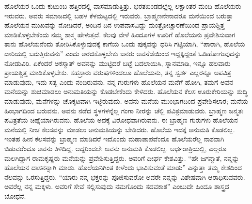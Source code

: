 ಹೊಲೆಯರ ಒಂದು ಕುಟುಂಬ ಹತ್ತಿರದಲ್ಲಿ ವಾಸಮಾಡುತ್ತಿತ್ತು. ಭರತಖಂಡದಲ್ಲೆಲ್ಲ ಲಕ್ಷಾಂತರ ಮಂದಿ ಹೊಲೆಯರು ಇರುವರು. ಅವರು ಸಮಾಜದಲ್ಲಿ ಬಹಳ ಕೆಳಮಟ್ಟದಲ್ಲಿ ಇರುವರು. ಬ್ರಾಹ್ಮಣನೇನಾದರೂ ಮನೆಯಿಂದ ಬರುತ್ತಾ ಹೊಲೆಯನ ಮುಖವನ್ನು ನೋಡಿದರೆ, ಅಂದಿನ ದಿನ ಉಪವಾಸವಿದ್ದು ಮಂತ್ರೋಚ್ಚಾರಣೆಯಿಂದ ಪ್ರಾಯಶ್ಚಿತ್ತ ಮಾಡಿಕೊಳ್ಳಬೇಕೆಂದು ನಮ್ಮ ಶಾಸ್ತ್ರ ಹೇಳುತ್ತದೆ. ಕೆಲವು ವೇಳೆ ಹಿಂದೂಗಳ ಊರಿಗೆ ಹೊಲೆಯನು ಪ್ರವೇಶಿಸುವಾಗ ತಾನು ಹೊಲೆಯನೆಂದು ತೋರಿಸಿಕೊಳ್ಳುವುದಕ್ಕೆ ಕಾಗೆಯ ಒಂದು ಪುಕ್ಕವನ್ನು ಧರಿಸಿ ಗಟ್ಟಿಯಾಗಿ, “ಪಾರಾಗಿ, ಹೊಲೆಯ ದಾರಿಯಲ್ಲಿ ಬರುತ್ತಿರುವನು” ಎಂದು ಅರಚಿಕೊಳ್ಳಬೇಕು ಜನರು ಅವನೆಡೆಯಿಂದ ಇದ್ದಕ್ಕಿದ್ದಂತೆ ಓಡಿಹೋಗುವುದನ್ನು ನೋಡುವಿರಿ. ಏಕೆಂದರೆ ಅಕಸ್ಮಾತ್​ ಅವನನ್ನು ಮುಟ್ಟಿದರೆ ಬಟ್ಟೆ ಬದಲಾಯಿಸಿ, ಸ್ನಾನಮಾಡಿ, ಇನ್ನೂ ಹಲವಾರು ಪ್ರಾಯಶ್ಚಿತ್ತ ಮಾಡಿಕೊಳ್ಳಬೇಕು. ಸಹಸ್ರಾರು ವರುಷಗಳಿಂದಲೂ ಹೊಲೆಯನು, ತನ್ನ ಸ್ವರ್ಶ ಎಲ್ಲರನ್ನೂ ಅಪವಿತ್ರ ಮಾಡುವುದು, ಇದು ಸತ್ಯ ಎಂದು ನಂಬಿರುವನು. ನನ್ನ ಗುರುಗಳು ಹೊಲೆಯನ ಮನೆಗೆ ಹೋಗಿ, ತಮಗೆ ಅವನ ಮನೆಯನ್ನು ಶುಚಿಮಾಡಲು ಅನುಮತಿಯನ್ನು ಕೊಡಬೇಕೆಂದು ಕೇಳಿದರು. ಹೊಲೆಯನ ಕೆಲಸ ಊರುಕೇರಿಯನ್ನು ಶುದ್ಧಿ ಮಾಡುವುದು, ಮನೆಗಳನ್ನು ಚೊಕ್ಕಟವಾಗಿ ಇಟ್ಟಿರುವುದು. ಅವನು ಮನೆಯ ಮುಂಭಾಗದಿಂದ ಪ್ರವೇಶಿಸಲಾರ; ಮನೆಯ ಹಿಂಭಾಗದಿಂದ ಬರುವನು. ಅವನು ನಡೆದ ಸ್ಥಳಗಳನ್ನೆಲ್ಲ ಗಂಗಾ ನೀರನ್ನು ಚೆಲ್ಲಿ ಪವಿತ್ರಮಾಡುವರು. ಬ್ರಾಹ್ಮಣ ಜನ್ಮತಃ ಪವಿತ್ರತೆಯ ಚಿಹ್ನೆಯಾಗಿರುವನು. ಹೊಲೆಯ ಅದಕ್ಕೆ ವಿರೋಧವಾಗಿರುವನು. ಈ ಬ್ರಾಹ್ಮಣ ಗುರುಗಳು ಹೊಲೆಯನ ಮನೆಯಲ್ಲಿ ನೀಚ ಕೆಲಸವನ್ನು ಮಾಡಲು ಅನುಮತಿಯನ್ನು ಬೇಡಿದರು. ಹೊಲೆಯ ಇದಕ್ಕೆ ಅನುಮತಿ ಕೊಡಲಿಲ್ಲ. ಇಂತಹ ಹೀನ ಕೆಲಸವನ್ನು ಬ್ರಾಹ್ಮಣ ಮಾಡಿದರೆ ಇದೊಂದು ಮಹಾಪಾಪವೆಂದೂ ಹೊಲೆಯರೆಲ್ಲ ನಾಶವಾಗಿ ಬಿಡುವರೆಂದೂ ಅವನು ತಿಳಿದಿದ್ದ. ಆದ್ದರಿಂದಲೇ ಅವನು ಅನುಮತಿ ಕೊಡಲಿಲ್ಲ. ಅರ್ಧರಾತ್ರಿಯಲ್ಲಿ, ಎಲ್ಲರೂ ಮಲಗಿದ್ದಾಗ ರಾಮಕೃಷ್ಣರು ಮನೆಯನ್ನು ಪ್ರವೇಶಿಸುತ್ತಿದ್ದರು. ಅವರಿಗೆ ದೀರ್ಘ ಕೇಶವಿತ್ತು. “ಹೇ ಜಗನ್ಮಾತೆ, ನನ್ನನ್ನು ಹೊಲೆಯನ ದಾಸನನ್ನಾಗಿ ಮಾಡು. ಹೊಲೆಯನಿಗಿಂತ ಕೀಳೆಂದು ಭಾವಿಸುವಂತೆ ಮಾಡು” ಎನ್ನುತ್ತಾ ತಮ್ಮ ಕೇಶದಿಂದ ನೆಲವನ್ನು ಒರಸುತ್ತಿದ್ದರು. “ಯಾರು ನನ್ನ ಭಕ್ತರನ್ನು ಪೂಜಿಸುವರೋ ಅವರೇ ನನ್ನನ್ನು ವಿಶೇಷವಾಗಿ ಆರಾಧಿಸುವವರು. ಅವರೆಲ್ಲ ನನ್ನ ಮಕ್ಕಳು. ಅವರಿಗೆ ಸೇವೆ ಸಲ್ಲಿಸುವುದು ನಮಗೊಂದು ಸದವಕಾಶ” ಎಂಬುದೇ ಹಿಂದೂ ಶಾಸ್ತ್ರದ ಬೋಧನೆ.


